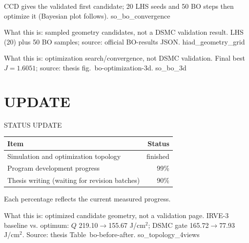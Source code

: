 \documentclass[aspectratio=169,11pt]{beamer}
\begin{document}
  {%
   CCD gives the validated first candidate; 20 LHS seeds and
   50 BO steps then optimize it (Bayesian plot follows).}
  {so_bo_convergence}


  {%
   What this is: sampled geometry candidates, not a DSMC validation result.
   LHS (20) plus 50 BO samples; source: official BO-results JSON.}
  {hiad_geometry_grid}

  {%
   What this is: optimization search/convergence, not DSMC validation.
   Final best $J=1.6051$; source: thesis fig.~bo-optimization-3d.}
  {so_bo_3d}



\section{UPDATE}
\begin{frame}{STATUS UPDATE}
  \begin{tabular}{@{}p{7.2cm}r@{}}
    \textbf{Item} & \textbf{Status} \\
    \hline
    Simulation and optimization topology & finished \\
    Program development progress & 99\% \\
    Thesis writing (waiting for revision batches) & 90\% \\
  \end{tabular}
  \vspace{0.4cm}
  \par{\scriptsize Each percentage reflects the current measured progress.}
\end{frame}

  {%
   What this is: optimized candidate geometry, not a validation page.
   IRVE-3 baseline vs. optimum: $Q$ 219.10$\rightarrow$155.67 J/cm$^2$;
   DSMC gate 165.72$\rightarrow$77.93 J/cm$^2$. Source: thesis Table~bo-before-after.}
  {so_topology_4views}
\end{document}

